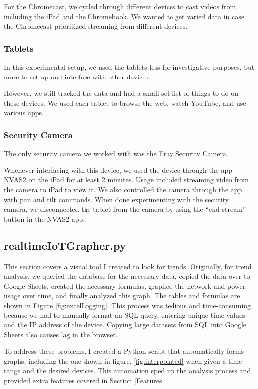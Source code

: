 For the Chromecast, we cycled through different devices to cast videos from, including the iPad and the Chromebook. We wanted to get varied data in case the Chromecast prioritized streaming from different devices.

\subsubsection{Tablets}
In this experimental setup, we used the tablets less for investigative purposes, but more to set up and interface with other devices.

However, we still tracked the data and had a small set list of things to do on these devices. We used each tablet to browse the web, watch YouTube, and use various apps.

\subsubsection{Security Camera}

The only security camera we worked with was the Eray Security Camera.

Whenever interfacing with this device, we used the device through the app NVAS2 \cite{nvas2} on the iPad for at least 2 minutes. Usage included streaming video from the camera to iPad to view it. We also controlled the camera through the app with pan and tilt commands. When done experimenting with the security camera, we disconnected the tablet from the camera by using the ``end stream'' button in the NVAS2 app.

\subsection{realtimeIoTGrapher.py}
\label{realtimeIoTGrapher.py}

This section covers a visual tool I created to look for trends. Originally, for trend analysis, we queried the database for the necessary data, copied the data over to Google Sheets, created the necessary formulas, graphed the network and power usage over time, and finally analyzed this graph. The tables and formulas are shown in Figure \ref{fig:excelLogging}. This process was tedious and time-consuming because we had to manually format an SQL query, entering unique time values and the IP address of the device. Copying large datasets from SQL into Google Sheets also causes lag in the browser.

To address these problems, I created a Python script that automatically forms graphs, including the one shown in figure, \ref{fig:interpolated} when given a time range and the desired devices. This automation sped up the analysis process and provided extra features covered in Section \ref{Features}.

